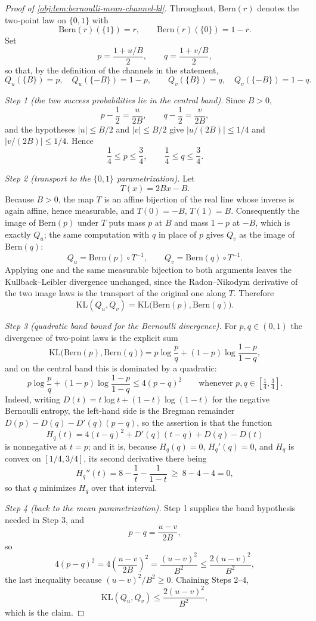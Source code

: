 \begin{proof}[Proof of \cref{obj:lem:bernoulli-mean-channel-kl}]
Throughout, \(\mathrm{Bern}(r)\) denotes the two-point law on \(\{0,1\}\) with
\[
\mathrm{Bern}(r)(\{1\})=r,
\qquad
\mathrm{Bern}(r)(\{0\})=1-r .
\]
Set
\[
p=\frac{1+u/B}{2},
\qquad
q=\frac{1+v/B}{2},
\]
so that, by the definition of the channels in the statement,
\[
Q_u(\{B\})=p,\quad Q_u(\{-B\})=1-p,
\qquad
Q_v(\{B\})=q,\quad Q_v(\{-B\})=1-q .
\]

\emph{Step 1 (the two success probabilities lie in the central band).} Since \(B>0\),
\[
p-\frac12=\frac{u}{2B},
\qquad
q-\frac12=\frac{v}{2B},
\]
and the hypotheses \(|u|\le B/2\) and \(|v|\le B/2\) give \(|u/(2B)|\le 1/4\) and \(|v/(2B)|\le 1/4\). Hence
\[
\frac14\le p\le \frac34,
\qquad
\frac14\le q\le \frac34 .
\]

\emph{Step 2 (transport to the \(\{0,1\}\) parametrization).} Let
\[
T(x)=2Bx-B .
\]
Because \(B>0\), the map \(T\) is an affine bijection of the real line whose inverse is again
affine, hence measurable, and \(T(0)=-B\), \(T(1)=B\). Consequently the image of
\(\mathrm{Bern}(p)\) under \(T\) puts mass \(p\) at \(B\) and mass \(1-p\) at \(-B\), which is exactly
\(Q_u\); the same computation with \(q\) in place of \(p\) gives \(Q_v\) as the image of
\(\mathrm{Bern}(q)\):
\[
Q_u=\mathrm{Bern}(p)\circ T^{-1},
\qquad
Q_v=\mathrm{Bern}(q)\circ T^{-1}.
\]
Applying one and the same measurable bijection to both arguments leaves the
Kullback--Leibler divergence unchanged, since the Radon--Nikodym derivative of the two image
laws is the transport of the original one along \(T\). Therefore
\[
\mathrm{KL}(Q_u,Q_v)
=
\mathrm{KL}\bigl(\mathrm{Bern}(p),\mathrm{Bern}(q)\bigr).
\]

\emph{Step 3 (quadratic band bound for the Bernoulli divergence).} For \(p,q\in(0,1)\) the
divergence of two-point laws is the explicit sum
\[
\mathrm{KL}\bigl(\mathrm{Bern}(p),\mathrm{Bern}(q)\bigr)
=
p\log\frac pq+(1-p)\log\frac{1-p}{1-q},
\]
and on the central band this is dominated by a quadratic:
\[
p\log\frac pq+(1-p)\log\frac{1-p}{1-q}
\le
4(p-q)^2
\qquad\text{whenever }p,q\in\left[\tfrac14,\tfrac34\right].
\]
Indeed, writing \(D(t)=t\log t+(1-t)\log(1-t)\) for the negative Bernoulli entropy, the left-hand
side is the Bregman remainder \(D(p)-D(q)-D'(q)(p-q)\), so the assertion is that the function
\[
H_q(t)=4(t-q)^2+D'(q)(t-q)+D(q)-D(t)
\]
is nonnegative at \(t=p\); and it is, because \(H_q(q)=0\), \(H_q'(q)=0\), and \(H_q\) is convex on
\([1/4,3/4]\), its second derivative there being
\[
H_q''(t)=8-\frac1t-\frac1{1-t}\ \ge\ 8-4-4=0 ,
\]
so that \(q\) minimizes \(H_q\) over that interval.

\emph{Step 4 (back to the mean parametrization).} Step 1 supplies the band hypothesis needed in
Step 3, and
\[
p-q=\frac{u-v}{2B},
\]
so
\[
4(p-q)^2
=
4\left(\frac{u-v}{2B}\right)^2
=
\frac{(u-v)^2}{B^2}
\le
\frac{2(u-v)^2}{B^2},
\]
the last inequality because \((u-v)^2/B^2\ge 0\). Chaining Steps 2--4,
\[
\mathrm{KL}(Q_u,Q_v)
\le
\frac{2(u-v)^2}{B^2},
\]
which is the claim. %
\end{proof}
